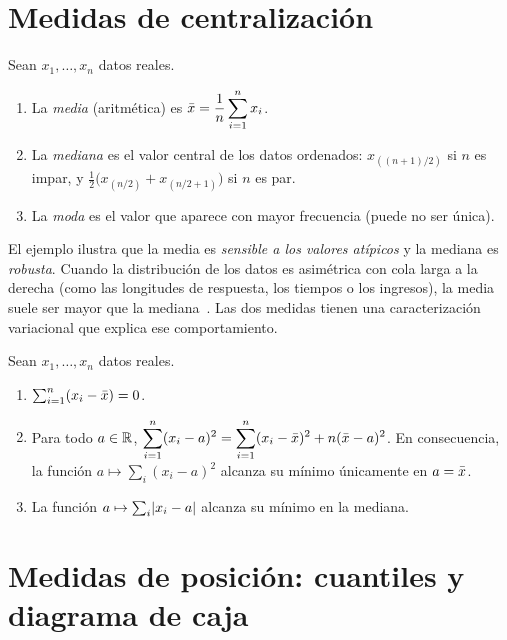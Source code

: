 \addtocounter{definicion}{1}%

\section{Medidas de centralización}

\begin{definicion}\label{def:t1-centro}
Sean $x_1,\dots,x_n$ datos reales.
\begin{enumerate}
  \item La \emph{media} (aritmética) es $\displaystyle\bar{x}=\frac1n\sum_{i=1}^{n}x_i$.
  \item La \emph{mediana} es el valor central de los datos ordenados: $x_{((n+1)/2)}$ si $n$ es impar, y $\tfrac12\bigl(x_{(n/2)}+x_{(n/2+1)}\bigr)$ si $n$ es par.
  \item La \emph{moda} es el valor que aparece con mayor frecuencia (puede no ser única).
\end{enumerate}
\end{definicion}

\addtocounter{definicion}{1}%

El ejemplo ilustra que la media es \emph{sensible a los valores atípicos} y la mediana es \emph{robusta}. Cuando la distribución de los datos es asimétrica con cola larga a la derecha (como las longitudes de respuesta, los tiempos o los ingresos), la media suele ser mayor que la mediana~\cite[§2.6]{openstax}. Las dos medidas tienen una caracterización variacional que explica ese comportamiento.

\begin{proposicion}\label{prop:t1-extremal}
Sean $x_1,\dots,x_n$ datos reales.
\begin{enumerate}
  \item $\sum_{i=1}^{n}(x_i-\bar{x})=0$.
  \item Para todo $a\in\mathbb{R}$, $\displaystyle\sum_{i=1}^{n}(x_i-a)^{2}=\sum_{i=1}^{n}(x_i-\bar{x})^{2}+n(\bar{x}-a)^{2}$. En consecuencia, la función $a\mapsto\sum_i(x_i-a)^{2}$ alcanza su mínimo únicamente en $a=\bar{x}$.
  \item La función $a\mapsto\sum_i\lvert x_i-a\rvert$ alcanza su mínimo en la mediana.
\end{enumerate}
\end{proposicion}

\section{Medidas de posición: cuantiles y diagrama de caja}

